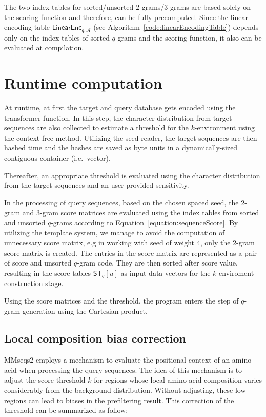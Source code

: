 \documentclass[twoside,a4paper,bsc]{master}
\newcommand{\Qgram}[1]{\(#1\)-gram}
\newcommand{\LE}[2]{\mathsf{LinearEnc}_{#1,#2}}
\newcommand{\Scoretablename}[0]{\mathsf{ST}}
\newcommand{\Scoretable}[2]{\Scoretablename_{#1}[#2]}
\newcommand{\Alpha}[0]{\mathcal{A}}
\begin{document}
The two index tables for sorted/unsorted \Qgram{2}s/\Qgram{3}s are based solely
on the scoring function and therefore, can be fully precomputed. Since the
linear encoding table \(\LE{q}{\Alpha}\) (see Algorithm~\ref{code:linearEncodingTable})
depends only on the index tables of sorted \Qgram{q}s and the scoring function, 
it also can be evaluated at compilation.

\section{Runtime computation}
At runtime, at first the target and query database gets encoded using the
transformer function. In this step, the character distribution from target
sequences are also collected to estimate a threshold for the \(k\)-environment
using the context-free method.
Utilizing the seed reader, the target
sequences are then hashed time and the hashes are saved as
byte units in a dynamically-sized contiguous container (i.e.\ vector).

Thereafter, an appropriate threshold is evaluated
using the character distribution from the target sequences and an user-provided
sensitivity.

In the processing of query sequences, based on the chosen spaced seed, the
\Qgram{2} and \Qgram{3} score matrices are evaluated using the index tables
from sorted and unsorted \Qgram{q}s according to
Equation~\ref{equation:sequenceScore}. By utilizing the template system, we
manage to avoid the computation of unnecessary score matrix, e.g in working with
seed of weight 4, only the \Qgram{2} score matrix is created. The entries in the
score matrix are represented as a pair of score and unsorted \Qgram{q} code. 
They are then sorted after score value, resulting in the score tables 
\(\Scoretable{q}{u}\) as input data vectors for the \(k\)-enviroment 
construction stage.

Using the score matrices and the threshold, the program enters the step of
\Qgram{q} generation using the Cartesian product.

\subsection{Local composition bias correction}
MMseqs2 employs a mechanism to evaluate the positional
context of an amino acid when processing the query sequences. The
idea of this mechanism is to adjust the score threshold \(k\)
for regions whose local amino acid composition varies
considerably from the background distribution. Without adjusting, these low
regions can lead to biases in the prefiltering result. This correction of
the threshold can be summarized as follow:
\end{document}
